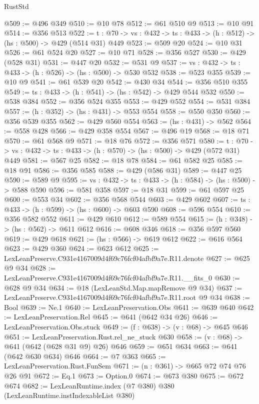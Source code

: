 \begin{lexlean}{RustStd}
\begin{coremodule}
@509 := @496 @349
@510 := @10 @78
@512 := @61 @510 @9
@513 := @10 @91
@514 := @356 @513
@522 := {t : @70} -> {vs : @432} -> {ts : @433} -> (h : @512) -> (hs : @500) -> @429 (@514 @31) @449
@523 := @509 @20
@524 := @10 @31
@526 := @61 @524 @20
@527 := @10 @71
@528 := @356 @527
@530 := @429 (@528 @31)
@531 := @447 @20
@532 := @531 @9
@537 := {vs : @432} -> {ts : @433} -> (h : @526) -> (hs : @500) -> @530 @532
@538 := @523 @355
@539 := @10 @9
@541 := @61 @539 @20
@542 := @430 @34
@544 := @356 @510 @355
@549 := {ts : @433} -> (h : @541) -> (hs : @542) -> @429 @544 @532
@550 := @538 @384
@552 := @356 @524 @355
@553 := @429 @552
@554 := @531 @384
@557 := (h : @352) -> (hs : @431) -> @553 @554
@558 := @550 @350
@560 := @356 @539 @355
@562 := @429 @560 @554
@563 := (hs : @431) -> @562
@564 := @558 @428
@566 := @429 @358 @554
@567 := @496 @19
@568 := @18 @71
@570 := @61 @568 @9
@571 := @18 @76
@572 := @356 @571
@580 := {t : @70} -> {vs : @432} -> {ts : @433} -> (h : @570) -> (hs : @500) -> @429 (@572 @31) @449
@581 := @567 @25
@582 := @18 @78
@584 := @61 @582 @25
@585 := @18 @91
@586 := @356 @585
@588 := @429 (@586 @31)
@589 := @447 @25
@590 := @589 @9
@595 := {vs : @432} -> {ts : @433} -> (h : @584) -> (hs : @500) -> @588 @590
@596 := @581 @358
@597 := @18 @31
@599 := @61 @597 @25
@600 := @553 @34
@602 := @356 @568 @544
@603 := @429 @602
@607 := {ts : @433} -> (h : @599) -> (hs : @600) -> @603 @590
@608 := @596 @554
@610 := @356 @582 @552
@611 := @429 @610
@612 := @589 @554
@615 := (h : @348) -> (hs : @562) -> @611 @612
@616 := @608 @346
@618 := @356 @597 @560
@619 := @429 @618
@621 := (hs : @566) -> @619 @612
@622 := @616 @564
@623 := @429 @360
@624 := @623 @612
@625 := LexLeanPreserve.C931e4167009d4f69c76fcf04afbf9a7e.R11.denote
@627 := @625 @9 @34
@628 := LexLeanPreserve.C931e4167009d4f69c76fcf04afbf9a7e.R11.__fits_0
@630 := @628 @9 @34
@634 := @18 (LexLeanStd.Map.mapRemove @9 @34)
@637 := LexLeanPreserve.C931e4167009d4f69c76fcf04afbf9a7e.R11.root @9 @34
@638 := Bool
@639 := Ne.{1}
@640 := LexLeanPreservation.Obs
@641 := @639 @640
@642 := LexLeanPreservation.Rel
@645 := @641 (@642 @34 @26)
@646 := LexLeanPreservation.Obs.stuck
@649 := (f : @638) -> (v : @68) -> @645 @646
@651 := LexLeanPreservation.Rust.rel_ne_stuck @630
@658 := (v : @68) -> @641 (@642 (@628 @31 @9) @26) @646
@659 := @651 @634
@663 := @641 (@642 @630 @634) @646
@664 := @7 @363
@665 := LexLeanPreservation.Rust.FunSem
@671 := (n : @361) -> @665 @72 @74 @76 @26 @91
@672 := Eq.{1}
@673 := Option.{0}
@674 := @673 @380
@675 := @672 @674
@682 := LexLeanRuntime.index (@7 @380) @380 (LexLeanRuntime.instIndexableList @380)

\end{coremodule}
\end{lexlean}
